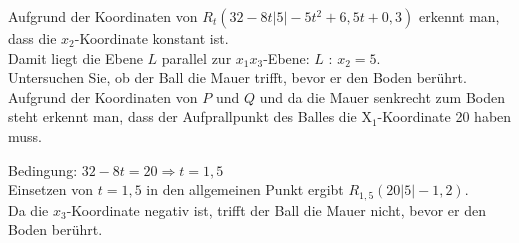 \documentclass[10pt]{article}
\begin{document}
Aufgrund der Koordinaten von $R_{t}\left(32-8 t|5|-5 t^{2}+6,5 t+0,3\right)$ erkennt man, dass die $x_{2}$-Koordinate konstant ist.\\
Damit liegt die Ebene $L$ parallel zur $x_{1} x_{3}$-Ebene: $L$ : $x_{2}=5$.\\
Untersuchen Sie, ob der Ball die Mauer trifft, bevor er den Boden berührt.\\
Aufgrund der Koordinaten von $P$ und $Q$ und da die Mauer senkrecht zum Boden steht erkennt man, dass der Aufprallpunkt des Balles die $\mathrm{X}_{1}$-Koordinate 20 haben muss.

Bedingung: $32-8 t=20 \Rightarrow t=1,5$\\
Einsetzen von $t=1,5$ in den allgemeinen Punkt ergibt $R_{1,5}(20|5|-1,2)$.\\
Da die $x_{3}$-Koordinate negativ ist, trifft der Ball die Mauer nicht, bevor er den Boden berührt.
\end{document}
